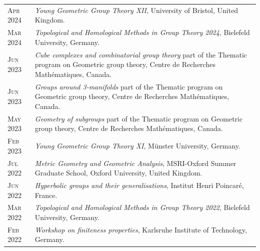 \documentclass[a4paper,10pt]{article} %
\begin{document}
\begin{longtable}{>{\raggedleft\arraybackslash}p{2cm}p{13cm}}
    \textsc{Apr 2024} & \emph{Young Geometric Group Theory XII}, University of Bristol, United Kingdom. \\ %
    
    \textsc{Mar 2024} & \emph{Topological and Homological Methods in Group Theory 2024}, Bielefeld
    University, Germany. \\ %

    \textsc{Jun 2023} & \emph{Cube complexes and combinatorial group theory} part of the Thematic program on Geometric group theory, Centre de Recherches Mathématiques, Canada. \\ %
    
    \textsc{Jun 2023} & \emph{Groups around 3-manifolds} part of the Thematic program on Geometric group theory,
    Centre de Recherches Mathématiques, Canada. \\ %

    \textsc{May 2023} & \emph{Geometry of subgroups} part of the Thematic program on Geometric group theory, Centre
    de Recherches Mathématiques, Canada. \\ %

    \textsc{Feb 2023} & \emph{Young Geometric Group Theory XI}, Münster University, Germany. \\ %

    \textsc{Jul 2022} & \emph{Metric Geometry and Geometric Analysis}, MSRI-Oxford Summer Graduate
    School, Oxford University, United Kingdom. \\ %

    \textsc{Jun 2022} & \emph{Hyperbolic groups and their generalisations}, Institut Henri Poincaré, France. \\ %

    \textsc{Mar 2022} & \emph{Topological and Homological Methods in Group Theory 2022}, Bielefeld University, Germany. \\ %
    
    \textsc{Feb 2022} & \emph{Workshop on finiteness properties}, Karlsruhe Institute of Technology, Germany. \\ %

\end{longtable}

\end{document}
